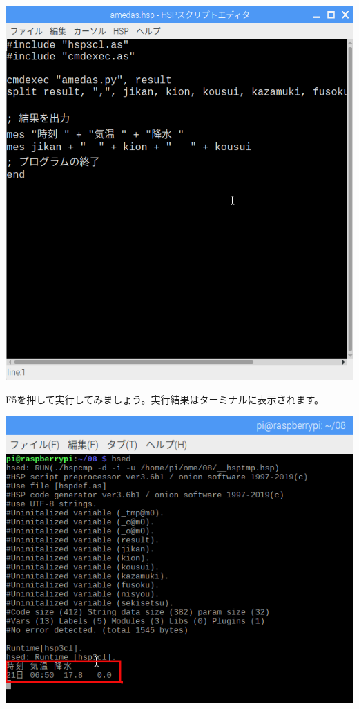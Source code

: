 \documentclass[a4paper,12pt,dvipdfmx]{jarticle}
\begin{document}
\begin{center}
\includegraphics[width=13.887cm]{textbook-img030.png}

\end{center}

\bigskip


\bigskip

\clearpage
F5を押して実行してみましょう。実行結果はターミナルに表示されます。



\begin{center}
\includegraphics[width=16.722cm]{textbook-img031.png}

\end{center}
\end{document}
